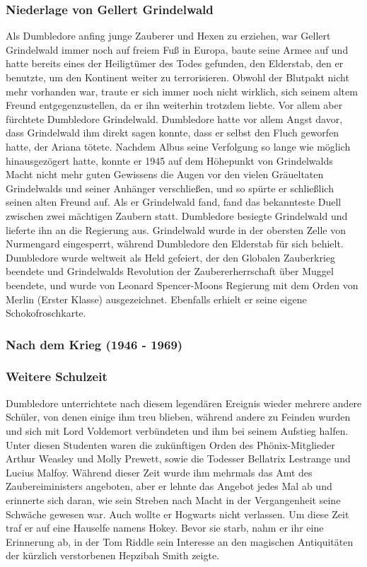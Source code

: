 \documentclass[a4paper, 10pt]{article}
\begin{document}
\subsubsection*{Niederlage von Gellert Grindelwald}
Als Dumbledore anfing junge Zauberer und Hexen zu erziehen, war Gellert Grindelwald immer noch auf freiem Fuß in Europa, baute seine Armee auf und hatte bereits eines der Heiligtümer des Todes gefunden, den Elderstab, den er benutzte, um den Kontinent weiter zu terrorisieren. Obwohl der Blutpakt nicht mehr vorhanden war, traute er sich immer noch nicht wirklich, sich seinem altem Freund entgegenzustellen, da er ihn weiterhin trotzdem liebte. Vor allem aber fürchtete Dumbledore Grindelwald. Dumbledore hatte vor allem Angst davor, dass Grindelwald ihm direkt sagen konnte, dass er selbst den Fluch geworfen hatte, der Ariana tötete. Nachdem Albus seine Verfolgung so lange wie möglich hinausgezögert hatte, konnte er 1945 auf dem Höhepunkt von Grindelwalds Macht nicht mehr guten Gewissens die Augen vor den vielen Gräueltaten Grindelwalds und seiner Anhänger verschließen, und so spürte er schließlich seinen alten Freund auf. Als er Grindelwald fand, fand das bekannteste Duell zwischen zwei mächtigen Zaubern statt. Dumbledore besiegte Grindelwald und lieferte ihn an die Regierung aus. Grindelwald wurde in der obersten Zelle von Nurmengard eingesperrt, während Dumbledore den Elderstab für sich behielt. Dumbledore wurde weltweit als Held gefeiert, der den Globalen Zauberkrieg beendete und Grindelwalds Revolution der Zaubererherrschaft über Muggel beendete, und wurde von Leonard Spencer-Moons Regierung mit dem Orden von Merlin (Erster Klasse) ausgezeichnet. Ebenfalls erhielt er seine eigene Schokofroschkarte.

\subsubsection*{\large Nach dem Krieg (1946 - 1969)}
\subsubsection*{Weitere Schulzeit}
Dumbledore unterrichtete nach diesem legendären Ereignis wieder mehrere andere Schüler, von denen einige ihm treu blieben, während andere zu Feinden wurden und sich mit Lord Voldemort verbündeten und ihm bei seinem Aufstieg halfen. Unter diesen Studenten waren die zukünftigen Orden des Phönix-Mitglieder Arthur Weasley und Molly Prewett, sowie die Todesser Bellatrix Lestrange und Lucius Malfoy. Während dieser Zeit wurde ihm mehrmals das Amt des Zaubereiministers angeboten, aber er lehnte das Angebot jedes Mal ab und erinnerte sich daran, wie sein Streben nach Macht in der Vergangenheit seine Schwäche gewesen war. Auch wollte er Hogwarts nicht verlassen.
\vspace{10pt}
\newline
Um diese Zeit traf er auf eine Hauselfe namens Hokey. Bevor sie starb, nahm er ihr eine Erinnerung ab, in der Tom Riddle sein Interesse an den magischen Antiquitäten der kürzlich verstorbenen Hepzibah Smith zeigte.
\end{document}
